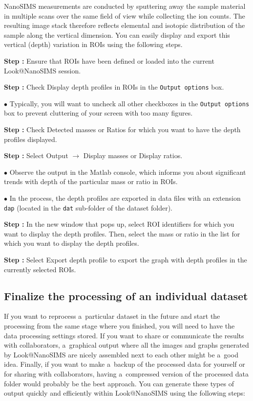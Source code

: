 \documentclass[a4paper, 11pt]{article}
\newcommand{\ttt}[1]{\texttt{#1}}
\newcommand{\lans}[1]{{\color{magenta}#1}}
\newcommand{\lanscb}[1]{{\color{darkgreen}#1}}
\newcommand\ra{\rightarrow}
\newcounter{step}
\newcommand\s{\addtocounter{step}{1}\noindent\textbf{Step \thestep:}{ }}
\newcommand\bul{\noindent$\bullet${ }}
\begin{document}
NanoSIMS measurements are conducted by sputtering away the sample material in multiple scans over the same field of view while collecting the ion counts. The resulting image stack therefore reflects elemental and isotopic distribution of the sample along the vertical dimension. You can easily display and export this vertical (depth) variation in ROIs using the following steps.

\s Ensure that ROIs have been defined or loaded into the current Look@NanoSIMS session.

\s Check \lanscb{Display depth profiles in ROIs} in the \ttt{Output options} box.

\bul Typically, you will want to uncheck all other checkboxes in the \ttt{Output options} box to prevent cluttering of your screen with too many figures.

\s Check \lanscb{Detected masses} or \lanscb{Ratios} for which you want to have the depth profiles displayed.

\s Select \lans{Output} $\ra$ \lans{Display masses} or \lans{Display ratios}.

\bul Observe the output in the Matlab console, which informs you about significant trends with depth of the particular mass or ratio in ROIs.

\bul In the process, the depth profiles are exported in data files with an extension \ttt{dap} (located in the \ttt{dat} sub-folder of the dataset folder).

\s In the new window that pops up, select ROI identifiers for which you want to display the depth profiles. Then, select the mass or ratio in the list for which you want to display the depth profiles.

\s Select \lans{Export depth profile} to export the graph with depth profiles in the currently selected ROIs.


\subsection{Finalize the processing of an individual dataset}
\setcounter{step}{0}

If you want to reprocess a~particular dataset in the future and start the processing from the same stage where you finished, you will need to have the data processing settings stored. If you want to share or communicate the results with collaborators, a~graphical output where all the images and graphs generated by Look@NanoSIMS are nicely assembled next to each other might be a~good idea. Finally, if you want to make a~backup of the processed data for yourself or for sharing with collaborators, having a~compressed version of the processed data folder would probably be the best approach. You can generate these types of output quickly and efficiently within Look@NanoSIMS using the following steps:
\end{document}
